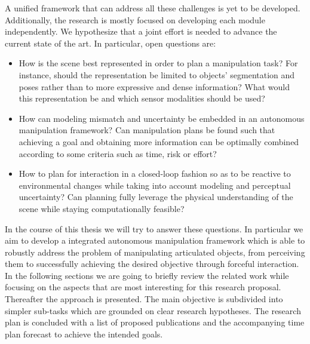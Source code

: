 \medskip 
A unified framework that can address all these challenges is yet to be developed. Additionally, the research is mostly focused on developing each module independently. We hypothesize that a joint effort is needed to advance the current state of the art. In particular, open questions are:
\begin{itemize}
\item How is the scene best represented in order to plan a manipulation task? For instance, should the representation be limited to objects' segmentation and poses rather than to more expressive and dense information? What would this representation be and which sensor modalities should be used? 
\item How can modeling mismatch and uncertainty be embedded in an autonomous manipulation framework? Can manipulation plans be found such that achieving a goal and obtaining more information can be optimally combined according to some criteria such as time, risk or effort?
\item How to plan for interaction in a closed-loop fashion so as to be reactive to environmental changes while taking into account modeling and perceptual uncertainty? Can planning fully leverage the physical understanding of the scene while staying computationally feasible?
\end{itemize}

In the course of this thesis we will try to answer these questions. In particular we aim to develop a integrated autonomous manipulation framework which is able to robustly address the problem of manipulating articulated objects, from perceiving them to successfully achieving the desired objective through forceful interaction. In the following sections we are going to briefly review the related work while focusing on the aspects that are most interesting for this research proposal. Thereafter the approach is presented. The main objective is subdivided into simpler sub-tasks which are grounded on clear research hypotheses. The research plan is concluded with a list of proposed publications and the accompanying time plan forecast to achieve the intended goals. 
